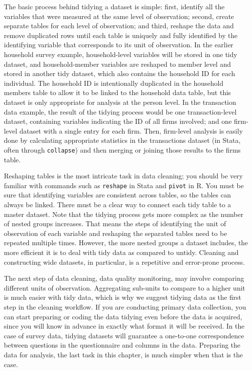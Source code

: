 The basic process behind tidying a dataset is simple: 
first, identify all the variables that were measured at the same level of observation;
second, create separate tables for each level of observation;
and third, reshape 
the data and remove duplicated rows 
until each table is uniquely and fully identified by the identifying variable 
that corresponds to its unit of observation.
In the earlier household survey example,
household-level variables will be stored in one tidy dataset, 
and household-member variables are reshaped to member level and stored in another tidy dataset,
which also contains the household ID for each individual.
The household ID is intentionally duplicated in the household members table
to allow it to be linked to the household data table,
but this dataset is only appropriate for analysis at the person level.
In the transaction data example,
the result of the tidying process would be one transaction-level dataset, 
containing variables indicating the ID of all firms involved;
and one firm-level dataset with a single entry for each firm.
Then, firm-level analysis is easily done 
by calculating appropriate statistics in the transactions dataset
(in Stata, often through \texttt{collapse})
and then merging or joining those results to the firms table.

Reshaping tables is the most intricate task in data cleaning;
you should be very familiar with commands such as \texttt{reshape} in Stata and \texttt{pivot} in R.
You must be sure that identifying variables are consistent across tables,
so the tables can always be linked.
There must be a clear way to connect each tidy table to a master dataset.
Note that the tidying process gets more complex as the number of nested groups increases.
That means the steps of identifying the unit of observation of each variable
and reshaping the separated tables need to be repeated multiple times.
However, the more nested groups a dataset includes,
the more efficient it is to deal with tidy data as compared to untidy.
Cleaning and constructing wide datasets, in particular,
is a repetitive and error-prone process.

The next step of data cleaning, data quality monitoring,
may involve comparing different units of observation.
Aggregating sub-units to compare to a higher unit is much easier with tidy data,
which is why we suggest tidying data as the first step in the cleaning workflow. 
If you are conducting primary data collection,
you can start preparing or coding the data tidying even before the data is acquired,
since you will know in advance in exactly what format it will be received.
In the case of survey data,
tidying datasets will guarantee a one-to-one correspondence
between questions in the questionnaire and columns in the data.
Preparing the data for analysis, the last task in this chapter, 
is much simpler when that is the case. 
 
